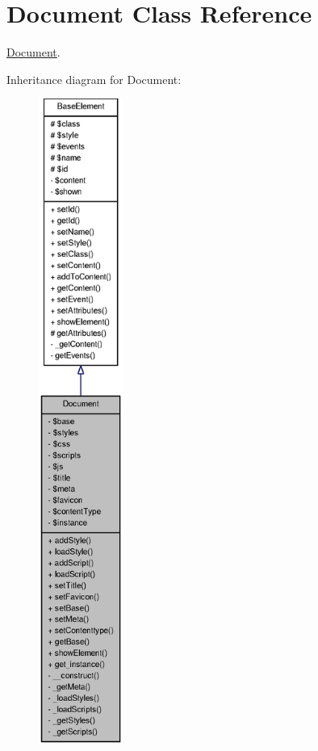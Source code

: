\section{Document Class Reference}
\label{classDocument}


\hyperlink{classDocument}{Document}.  




Inheritance diagram for Document:
\nopagebreak
\begin{figure}[H]
\begin{center}
\leavevmode
\includegraphics[height=600pt]{classDocument__inherit__graph}
\end{center}
\end{figure}


